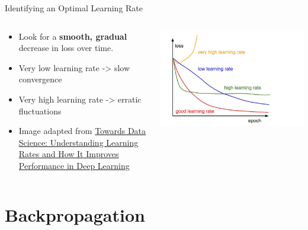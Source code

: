 \documentclass[serif, aspectratio=169]{beamer}
\begin{document}
\begin{frame}{Identifying an Optimal Learning Rate}
    \begin{columns}[T] %
        \begin{column}{0.5\textwidth}
            \begin{itemize}
                \item Look for a \textbf{smooth, gradual} decrease in loss over time.
                \item Very low learning rate -> slow convergence
                \item Very high learning rate -> erratic fluctuations
                \item Image adapted from \href{https://towardsdatascience.com/understanding-learning-rates-and-how-it-improves-performance-in-deep-learning-d0d4059c1c10}{Towards Data Science: Understanding Learning Rates and How It Improves Performance in Deep Learning}
            \end{itemize}
        \end{column}
        \begin{column}{0.5\textwidth}
            \begin{center}
                \includegraphics[width=\textwidth, keepaspectratio]{pic/1_rcmvCjQvsxrJi8Y4HpGcCw.png}
            \end{center}
        \end{column}
    \end{columns}
\end{frame}



\section{Backpropagation}
\end{document}
